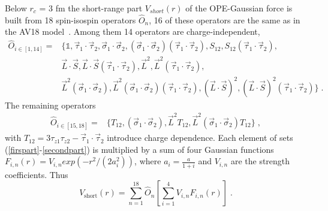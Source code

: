 Below $r_{c}$ = 3 fm the short-range part $V_{short}(r)$ of the OPE-Gaussian force is built from 18 spin-isospin operators $\hat{O}_{n}$, 16 of these operators are the same as in the AV18 model~\cite{stoks1993partial}. Among them 14 operators are charge-independent,
\begin{equation}
\begin{split}
\hat{O}_{i\in\left[1, 14\right]} = &\lbrace\mathds{1}, \vec{\tau}_{1}\cdot\vec{\tau}_{2}, \vec{\sigma}_{1}\cdot\vec{\sigma}_{2}, (\vec{\sigma}_{1}\cdot\vec{\sigma}_{2})(\vec{\tau}_{1}\cdot\vec{\tau}_{2}), S_{12}, S_{12}(\vec{\tau}_{1}\cdot\vec{\tau}_{2}),\\ &\vec{L}\cdot\vec{S}, \vec{L}\cdot\vec{S}(\vec{\tau}_{1}\cdot\vec{\tau}_{2}), \!\vec{L}^{2}, \!\vec{L}^{2}(\vec{\tau}_{1}\cdot\vec{\tau}_{2}), \\ &\!\vec{L}^{2}(\vec{\sigma}_{1}\cdot\vec{\sigma}_{2}), \!\vec{L}^{2}(\vec{\sigma}_{1}\cdot\vec{\sigma}_{2})(\vec{\tau}_{1}\cdot\vec{\tau}_{2}), (\vec{L}\cdot\vec{S})^{2}, (\vec{L}\cdot\vec{S})^{2}(\vec{\tau}_{1}\cdot\vec{\tau}_{2})\rbrace\;.
\end{split}
\label{firspart}
\end{equation}
The remaining operators
\begin{equation}
\begin{split}
\hat{O}_{i\in\left[15, 18\right]} = &\lbrace T_{12}, (\vec{\sigma}_{1}\cdot\vec{\sigma}_{2}),  \!\vec{L}^{2}T_{12}, \!\vec{L}^{2}(\vec{\sigma}_{1}\cdot\vec{\sigma}_{2})T_{12}\rbrace\;,
\label{secondpart}
\end{split}
\end{equation}
with $T_{12} = 3\tau_{z1} \tau_{z2} - \vec{\tau}_{1}\cdot\vec{\tau}_{2}$ introduce charge dependence.
Each element of sets (\ref{firspart}-\ref{secondpart}) is multiplied by a sum of four Gaussian functions $F_{i, n}(r) = V_{i,n} exp(-r^{2}/(2a^{2}_{i}))$, where $a_{i} = \frac{a}{1 + i}$ and $V_{i,n}$ are the strength coefficients. Thus
\begin{equation} 
V_{\mathrm{short}}(r) = \sum_{n = 1}^{18}\hat{O}_{n}\left[\sum_{i = 1}^{4}V_{i, n}F_{i, n}(r) \right]\;.
\end{equation}
